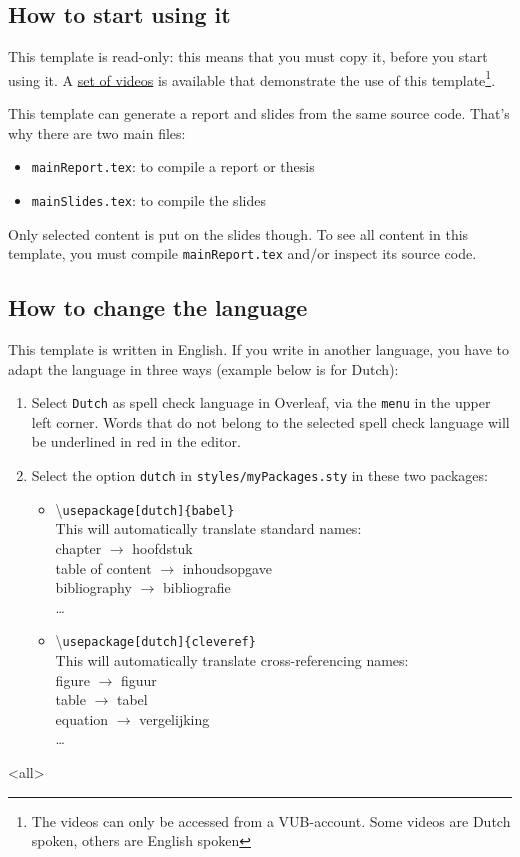 \subsection{How to start using it}
This template is read-only: this means that you must copy it, before you start using it. A \href{https://vub.cloud.panopto.eu/Panopto/Pages/Sessions/List.aspx?folderID=eb5cbed1-a7f8-4d08-bca3-ad1e00db8d7a}{set of videos} is available that demonstrate the use of this template\footnote{The videos can only be accessed from a VUB-account. Some videos are Dutch spoken, others are English spoken}.

This template can generate a report and slides from the same source code. That's why there are two main files:
\begin{itemize}
    \item \texttt{mainReport.tex}: to compile a report or thesis
    \item \texttt{mainSlides.tex}: to compile the slides
\end{itemize}

Only selected content is put on the slides though. To see all content in this template, you must compile \texttt{mainReport.tex} and/or inspect its source code.

\subsection{How to change the language}

This template is written in English. If you write in another language, you have to adapt the language in three ways (example below is for Dutch):
\begin{enumerate}
    \item Select \texttt{Dutch} as spell check language in Overleaf, via the \texttt{menu} in the upper left corner. Words that do not belong to the selected spell check language will be underlined in red in the editor. 
    \item Select the option \texttt{dutch} in \texttt{styles/myPackages.sty} in these two packages:
    \begin{itemize}
        \item \textbackslash\verb|usepackage[dutch]{babel}|\\
        This will automatically translate standard names:\\
        chapter $\to$ hoofdstuk\\
        table of content $\to$ inhoudsopgave\\
        bibliography $\to$ bibliografie\\\dots
        \item \textbackslash\verb|usepackage[dutch]{cleveref}|\\
        This will automatically translate cross-referencing names:
        \\figure $\to$ figuur\\
        table $\to$ tabel\\
        equation $\to$ vergelijking\\\dots
    \end{itemize}
\end{enumerate}
    

\mode<all>